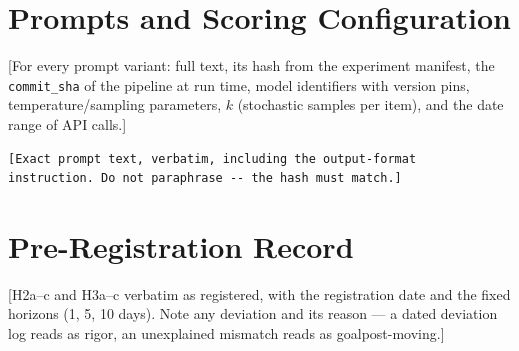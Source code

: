 \chapter{Prompts and Scoring Configuration}
\label{app:prompts}

[For every prompt variant: full text, its hash from the experiment
manifest, the \texttt{commit\_sha} of the pipeline at run time, model
identifiers with version pins, temperature/sampling parameters, $k$
(stochastic samples per item), and the date range of API calls.]

\begin{lstlisting}[caption={Scalar-label prompt variant. [Replace with the exact registered prompt; repeat for the soft-label variant.]}, label={lst:prompt-scalar}]
[Exact prompt text, verbatim, including the output-format
instruction. Do not paraphrase -- the hash must match.]
\end{lstlisting}

\chapter{Pre-Registration Record}
\label{app:prereg}

[H2a--c and H3a--c verbatim as registered, with the registration date
and the fixed horizons (1, 5, 10 days). Note any deviation and its
reason --- a dated deviation log reads as rigor, an unexplained
mismatch reads as goalpost-moving.]
